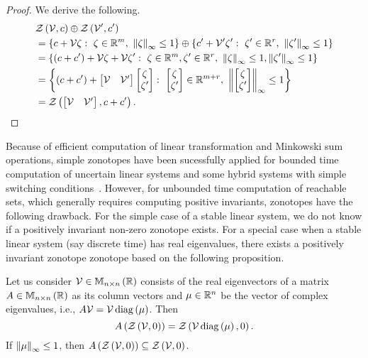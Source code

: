 %
\begin{proof}
We derive the following.
%
\begin{align*}
& \mathit{\mathcal{Z}}\left(\mathcal{V},c\right)\oplus\mathit{\mathcal{Z}}\left(\mathcal{V}^\prime,c^\prime\right)\\
& = \left\{c+\mathcal{V}\zeta:~\zeta\in\mathbb{R}^m,~\left\|\zeta\right\|_{\infty}\leq
    1\right\}\oplus\left\{c^\prime+\mathcal{V}^\prime\zeta^\prime:~\zeta^\prime\in\mathbb{R}^r,~\left\|\zeta^\prime\right\|_{\infty}\leq
    1\right\}\\
& =
  \left\{\left(c+c^\prime\right)+\mathcal{V}\zeta+\mathcal{V}\zeta^\prime:~\zeta\in\mathbb{R}^m,\zeta^\prime\in\mathbb{R}^r,~\left\|\zeta\right\|_{\infty}\leq
    1,\left\|\zeta^\prime\right\|_{\infty}\leq 1\right\}\\
& = \left\{\left(c+c^\prime\right)+\left[\begin{matrix}\mathcal{V}
      &\mathcal{V}^\prime\end{matrix}\right]\left[\begin{matrix}\zeta\\\zeta^\prime\end{matrix}\right]:~\left[\begin{matrix}\zeta\\\zeta^\prime\end{matrix}\right]\in\mathbb{R}^{m+r},~\left\|\left[\begin{matrix}\zeta\\\zeta^\prime\end{matrix}\right]\right\|_{\infty}\leq
    1\right\}\\
& =  \mathit{\mathcal{Z}}\left(\left[\begin{matrix}\mathcal{V} & \mathcal{V}^\prime\end{matrix}\right],c+c^\prime\right).\hspace{3em}\qedhere
\end{align*}
%
\end{proof}
%
Because of efficient computation of linear transformation and
Minkowski sum operations, simple zonotopes have been sucessfully
applied for bounded time computation of uncertain linear systems and
some hybrid systems with simple switching conditions~\cite{todo}.
However, for unbounded time computation of reachable sets, which
generally requires computing positive invariants, zonotopes have the
following drawback.  For the simple case of a stable linear system, we
do not know if a positively invariant non-zero zonotope exists.  For a
special case when a stable linear system (say discrete
time) has real eigenvalues, there exists a positively invariant
zonotope zonotope based on the following proposition.
%
\begin{proposition}
Let us consider $\mathcal{V}\in\mathbb{M}_{n\times n}\left(\mathbb{R}\right)$ consists
of the real eigenvectors of a matrix $A\in\mathbb{M}_{n\times n}\left(\mathbb{R}\right)$ as
its column vectors and $\mu\in\mathbb{R}^n$ be the vector of complex
eigenvalues, i.e., $A\mathcal{V}
= \mathcal{V}\operatorname{diag}\left(\mu\right)$.  Then \[A\left(\mathit{\mathcal{Z}}\left(\mathcal{V},0\right)\right)
= \mathit{\mathcal{Z}}\left(\mathcal{V}\operatorname{diag}\left(\mu\right),0\right).\] If
$\left\|\mu\right\|_{\infty}\leq 1$, then
$A\left(\mathit{\mathcal{Z}}\left(\mathcal{V},0\right)\right)\subseteq \mathit{\mathcal{Z}}\left(\mathcal{V},0\right)$.
\end{proposition}
% 
